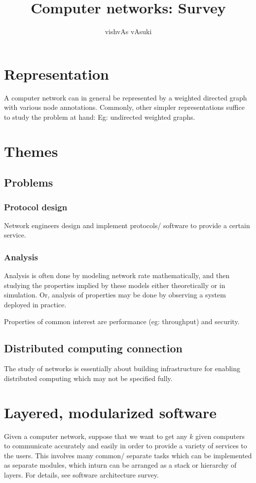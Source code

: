 \documentclass[oneside, article]{memoir}
\title{Computer networks: Survey}
\author{vishvAs vAsuki}
\begin{document}
\maketitle

\tableofcontents

\chapter{Representation}
A computer network can in general be represented by a weighted directed graph with various node annotations. Commonly, other simpler representations suffice to study the problem at hand: Eg: undirected weighted graphs.

\chapter{Themes}
\section{Problems}
\subsection{Protocol design}
Network engineers design and implement protocols/ software to provide a certain service.

\subsection{Analysis}
Analysis is often done by modeling network rate mathematically, and then studying the properties implied by these models either theoretically or in simulation. Or, analysis of properties may be done by observing a system deployed in practice.

Properties of common interest are performance (eg: throughput) and security.

\section{Distributed computing connection}
The study of networks is essentially about building infrastructure for enabling distributed computing which may not be specified fully.

\chapter{Layered, modularized software}
Given a computer network, suppose that we want to get any $k$ given computers to communicate accurately and easily in order to provide a variety of services to the users. This involves many common/ separate tasks which can be implemented as separate modules, which inturn can be arranged as a stack or hierarchy of layers. For details, see software architecture survey.
\end{document}
